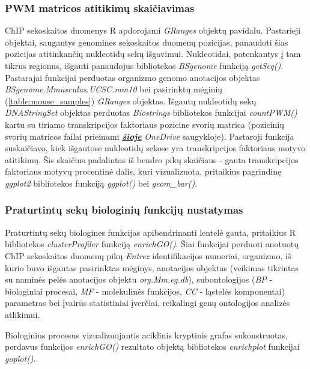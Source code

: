 \documentclass[12pt]{article}
\begin{document}
\subsubsection*{PWM matricos atitikimų skaičiavimas}
ChIP sekoskaitos duomenys R apdorojami \emph{GRanges} objektų pavidalu.
Pastarieji objektai, saugantys genomines sekoskaitos duomenų pozicijas,
panaudoti šias pozicijas atitinkančių nukleotidų sekų išgavimui. Nukleotidai,
patenkantys į tam tikrus regionus, išgauti panaudojus bibliotekos
\emph{BSgenome} \cite{BSGENOME} funkciją \emph{getSeq()}. Pastarajai funkcijai
perduotas organizmo genomo anotacijos objektas
\emph{BSgenome.Mmusculus.UCSC.mm10} \cite{BSMUSMUSCULUS} bei pasirinktų
mėginių (\ref{table:mouse_samples}) \emph{GRanges} objektas. Išgautų nukleotidų
sekų \emph{DNAStringSet} objektas perduotas \emph{Biostrings} \cite{BIOSTRINGS} 
bibliotekos funkcijai \emph{countPWM()} kartu su tiriamo transkripcijos
faktoriaus pozicine svorių matrica (pozicinių svorių matricos failai prieinami
\href{https://vult-my.sharepoint.com/:f:/g/personal/daniele_stasiunaite_mif_stud_vu_lt/EtEGQ8POkapLhPv6eHvl48cB-jmes81M0JPW8PVWTz2QgA?e=wjSSKJ}{\textbf{\emph{šioje}}}
\emph{OneDrive} saugykloje).
Pastaroji funkcija suskaičiavo, kiek išgautose nukleotidų sekose yra
transkripcijos faktoriaus motyvo atitikimų. Šis skaičius padalintas iš bendro
pikų skaičiaus - gauta transkripcijos faktoriaus motyvų procentinė dalis, kuri
vizualizuota, pritaikius pagrindinę \emph{ggplot2} bibliotekos funkciją
\emph{ggplot()} bei \emph{geom\_bar()}.

\subsubsection*{Praturtintų sekų biologinių funkcijų nustatymas}
Praturtintų sekų biologines funkcijas apibendrinanti lentelė gauta, pritaikius R
bibliotekos \emph{clusterProfiler} \cite{CLUSTERPROFILER} funkciją
\emph{enrichGO()}. Šiai funkcijai perduoti anotuotų ChIP sekoskaitos duomenų
pikų \emph{Entrez} identifikacijos numeriai, organizmo, iš kurio buvo išgautas
pasirinktas mėginys, anotacijos objektas (veikimas tikrintas su naminės pelės
anotacijos objektu \emph{org.Mm.eg.db}), subontologijos (\emph{BP} -
biologiniai procesai, \emph{MF} - molekulinės funkcijos, \emph{CC} - ląstelės
komponentai) parametras bei įvairūs statistiniai įverčiai, reikalingi genų
ontologijos analizės atlikimui.

Biologinius procesus vizualizuojantis aciklinis kryptinis grafas sukonstruotas,
perdavus funkcijos \emph{enrichGO()} rezultato objektą bibliotekos
\emph{enrichplot} \cite{ENRICHPLOT} funkcijai \emph{goplot()}.
\end{document}
